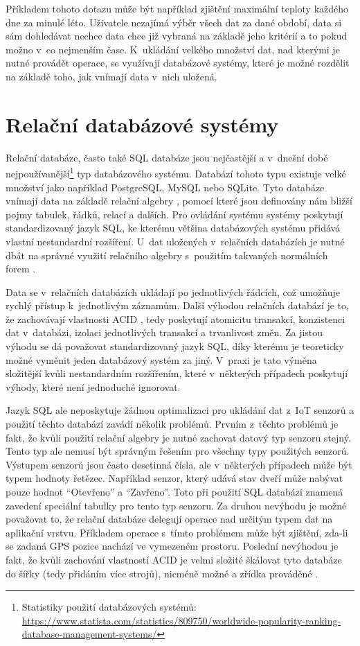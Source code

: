 Příkladem tohoto dotazu může být například zjištění maximální teploty každého dne za minulé léto. Uživatele nezajímá výběr všech dat za dané období, data si sám dohledávat nechce data chce již vybraná na základě jeho kritérií a to pokud možno v~co nejmenším čase. K~ukládání velkého množství dat, nad kterými je nutné provádět operace, se využívají databázové systémy, které je možné rozdělit na základě toho, jak vnímají data v~nich uložená.

\section{Relační databázové systémy}
Relační databáze, často také SQL databáze jsou nejčastější a v~dnešní době nejpoužívanější\footnote{Statistiky použití databázových systémů: \url{https://www.statista.com/statistics/809750/worldwide-popularity-ranking-database-management-systems/}} typ databázového systému. Databází tohoto typu existuje velké množství jako například PostgreSQL, MySQL nebo SQLite. Tyto databáze vnímají data na základě relační algebry \cite{Codd2002}, pomocí které jsou definovány nám bližší pojmy tabulek, řádků, relací a dalších. Pro ovládání systému systémy poskytují standardizovaný jazyk SQL, ke kterému většina databázových systému přidává vlastní nestandardní rozšíření. U~dat uložených v~relačních databázích je nutné dbát na správné využití relačního algebry s~použitím takvaných normálních forem \cite{KOHLER201888}. 

Data se v~relačních databázích ukládají po jednotlivých řádcích, což umožňuje rychlý přístup k~jednotlivým záznamům. Další výhodou relačních databází je to, že zachovávají vlastnosti ACID \cite{10.1145/289.291}, tedy poskytují atomicitu transakcí, konzistenci dat v~databázi, izolaci jednotlivých transakcí a trvanlivost změn. Za jistou výhodu se dá považovat standardizovaný jazyk SQL, díky kterému je teoreticky možné vyměnit jeden databázový systém za jiný. V~praxi je tato výměna složitější kvůli nestandardním rozšířením, které v~některých případech poskytují výhody, které není jednoduché ignorovat.

Jazyk SQL ale neposkytuje žádnou optimalizaci pro ukládání dat z~IoT senzorů a použití těchto databází zavádí několik problémů. Prvním z~těchto problémů je fakt, že kvůli použití relační algebry je nutné zachovat datový typ senzoru stejný. Tento typ ale nemusí být správným řešením pro všechny typy použitých senzorů. Výstupem senzorů jsou často desetinná čísla, ale v~některých případech může být typem hodnoty řetězec. Například senzor, který udává stav dveří může nabývat pouze hodnot “Otevřeno” a “Zavřeno”. Toto při použití SQL databází znamená zavedení speciální tabulky pro tento typ senzoru. Za druhou nevýhodu je možné považovat to, že relační databáze delegují operace nad určitým typem dat na aplikační vrstvu. Příkladem operace s~tímto problémem může být zjištění, zda-li se zadaná GPS pozice nachází ve vymezeném prostoru. Poslední nevýhodou je fakt, že kvůli zachování vlastností ACID je velmi složité škálovat tyto databáze do šířky (tedy přidáním více strojů), nicméně možné a zřídka prováděné \cite{10.1145/1966989.1971597}.
